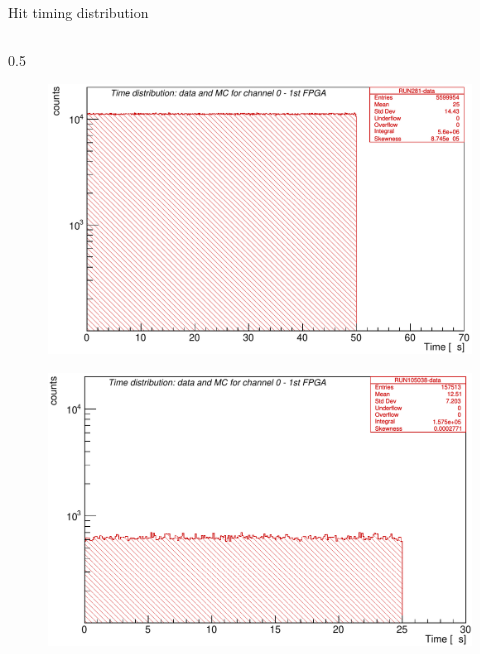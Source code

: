 \documentclass{beamer}
\begin{document}
    \begin{frame}{Hit timing distribution}
        \vspace{-3mm}
        \begin{columns}
            \begin{column}{0.5\framewidth}
                \begin{figure}[h!]
                  \centering
                  \hspace*{-2em}
                \includegraphics[width=0.85\columnwidth]{figures/png/Screenshot_20241013_115510.png}
                  \label{fig:enter-label} 
                  \end{figure}
                  \vspace{-4mm}
                  \begin{figure}[h!]
                    \centering
                    \hspace*{-2em}
                  \includegraphics[width=0.85\columnwidth]{figures/png/Screenshot_20241013_115638.png}
                    \label{fig:enter-label} 
                    \end{figure}
            \end{column}

\end{columns}
\end{frame}
\end{document}
